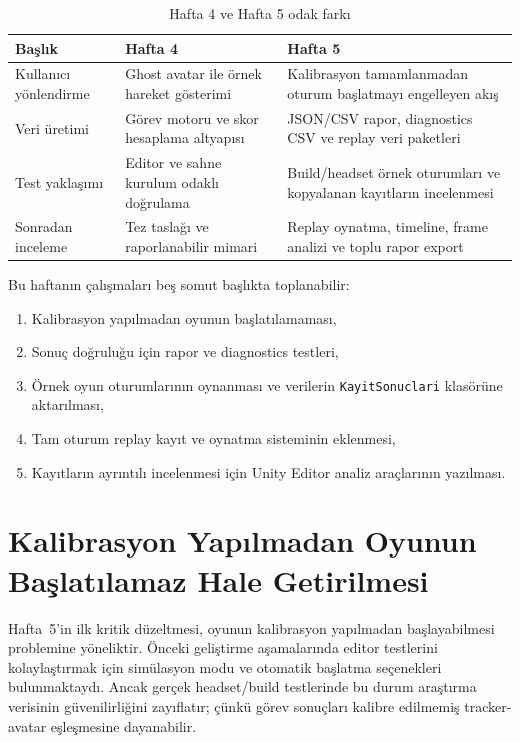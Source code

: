 \documentclass[11pt,a4paper]{article}
\begin{document}
\begin{table}[H]
\centering
\caption{Hafta 4 ve Hafta 5 odak farkı}
\label{tab:hafta45}
\renewcommand{\arraystretch}{1.25}
\begin{tabularx}{\textwidth}{lXX}
\toprule
\textbf{Başlık} & \textbf{Hafta 4} & \textbf{Hafta 5} \\
\midrule
Kullanıcı yönlendirme & Ghost avatar ile örnek hareket gösterimi & Kalibrasyon tamamlanmadan oturum başlatmayı engelleyen akış \\
Veri üretimi & Görev motoru ve skor hesaplama altyapısı & JSON/CSV rapor, diagnostics CSV ve replay veri paketleri \\
Test yaklaşımı & Editor ve sahne kurulum odaklı doğrulama & Build/headset örnek oturumları ve kopyalanan kayıtların incelenmesi \\
Sonradan inceleme & Tez taslağı ve raporlanabilir mimari & Replay oynatma, timeline, frame analizi ve toplu rapor export \\
\bottomrule
\end{tabularx}
\end{table}

Bu haftanın çalışmaları beş somut başlıkta toplanabilir:

\begin{enumerate}[nosep]
    \item Kalibrasyon yapılmadan oyunun başlatılamaması,
    \item Sonuç doğruluğu için rapor ve diagnostics testleri,
    \item Örnek oyun oturumlarının oynanması ve verilerin \texttt{KayitSonuclari} klasörüne aktarılması,
    \item Tam oturum replay kayıt ve oynatma sisteminin eklenmesi,
    \item Kayıtların ayrıntılı incelenmesi için Unity Editor analiz araçlarının yazılması.
\end{enumerate}

\section{Kalibrasyon Yapılmadan Oyunun Başlatılamaz Hale Getirilmesi}
\label{sec:kalibrasyon}

Hafta~5'in ilk kritik düzeltmesi, oyunun kalibrasyon yapılmadan
başlayabilmesi problemine yöneliktir. Önceki geliştirme aşamalarında editor
testlerini kolaylaştırmak için simülasyon modu ve otomatik başlatma
seçenekleri bulunmaktaydı. Ancak gerçek headset/build testlerinde bu durum
araştırma verisinin güvenilirliğini zayıflatır; çünkü görev sonuçları
kalibre edilmemiş tracker-avatar eşleşmesine dayanabilir.
\end{document}
